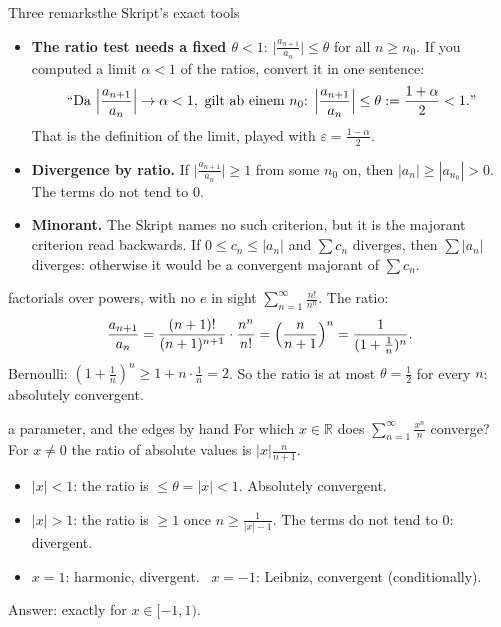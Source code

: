 \documentclass{kaelearn}
\newcommand\R{\mathbb R}
\newcommand\eps{\varepsilon}
\begin{document}
\begin{panel}[unbreakable]{Three remarks}{the Skript's exact tools}{}
\begin{itemize}
  \item \textbf{The ratio test needs a fixed $\theta<1$}: $\bigl|\frac{a_{n+1}}{a_n}\bigr|\le\theta$ for all $n\ge n_0$. If you
        computed a limit $\alpha<1$ of the ratios, convert it in one sentence:
        \[ \text{``Da }\Bigl|\frac{a_{n+1}}{a_n}\Bigr|\to\alpha<1,\text{ gilt ab einem }n_0\text{: }
           \Bigl|\frac{a_{n+1}}{a_n}\Bigr|\le\theta:=\frac{1+\alpha}2<1.\text{''} \]
        That is the definition of the limit, played with $\eps=\frac{1-\alpha}2$.
  \item \textbf{Divergence by ratio.} If $\bigl|\frac{a_{n+1}}{a_n}\bigr|\ge1$ from some $n_0$ on, then
        $|a_n|\ge|a_{n_0}|>0$. The terms do not tend to $0$.
  \item \textbf{Minorant.} The Skript names no such criterion, but it is the majorant criterion read backwards. If
        $0\le c_n\le|a_n|$ and $\sum c_n$ diverges, then $\sum|a_n|$ diverges: otherwise it would be a convergent majorant
        of $\sum c_n$.
\end{itemize}
\end{panel}

\begin{example}{factorials over powers, with no $e$ in sight}
$\displaystyle\sum_{n=1}^\infty\frac{n!}{n^n}$. The ratio:
\[ \frac{a_{n+1}}{a_n}=\frac{(n+1)!}{(n+1)^{n+1}}\cdot\frac{n^n}{n!}=\Bigl(\frac n{n+1}\Bigr)^n=\frac1{(1+\frac1n)^n}. \]
Bernoulli: $(1+\frac1n)^n\ge1+n\cdot\frac1n=2$. So the ratio is at most $\theta=\frac12$ for every $n$: absolutely convergent.
\end{example}

\begin{example}{a parameter, and the edges by hand}
For which $x\in\R$ does $\sum_{n=1}^\infty\frac{x^n}n$ converge? For $x\ne0$ the ratio of absolute values is
$|x|\frac n{n+1}$.
\begin{itemize}
  \item $|x|<1$: the ratio is $\le\theta=|x|<1$. Absolutely convergent.
  \item $|x|>1$: the ratio is $\ge1$ once $n\ge\frac1{|x|-1}$. The terms do not tend to $0$: divergent.
  \item $x=1$: harmonic, divergent. \ $x=-1$: Leibniz, convergent (conditionally).
\end{itemize}
Answer: exactly for $x\in[-1,1)$.
\end{example}
\end{document}
